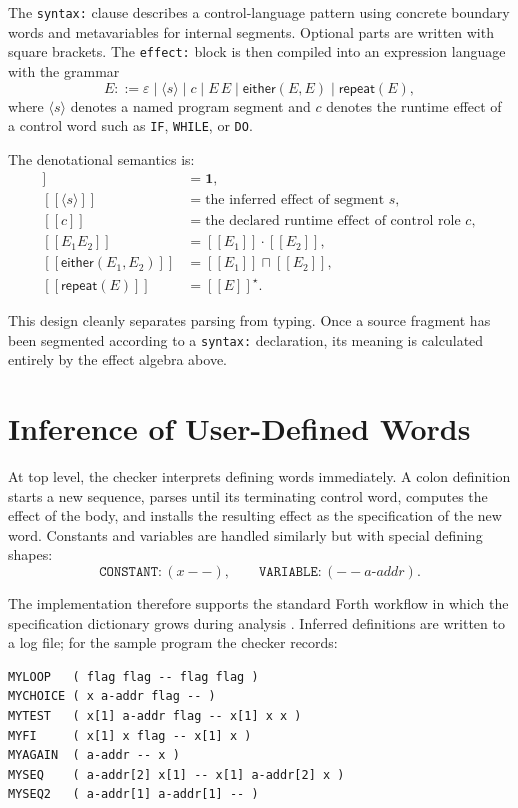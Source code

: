 \documentclass[11pt]{article}
\newcommand{\glb}{\mathbin{\sqcap}}
\newcommand{\compose}{\mathbin{\cdot}}
\newcommand{\eps}{\varepsilon}
\newcommand{\id}{\mathbf{1}}
\newcommand{\sem}[1]{[\![#1]\!]}
\begin{document}
The \texttt{syntax:} clause describes a control-language pattern using concrete boundary words and metavariables for internal segments. Optional parts are written with square brackets. The \texttt{effect:} block is then compiled into an expression language with the grammar
\[
E ::= \eps \mid \langle s \rangle \mid c \mid E\,E \mid \textsf{either}(E,E) \mid \textsf{repeat}(E),
\]
where $\langle s \rangle$ denotes a named program segment and $c$ denotes the runtime effect of a control word such as \texttt{IF}, \texttt{WHILE}, or \texttt{DO}.

The denotational semantics is:
\begin{align*}
\sem{\eps} &= \id,\\
\sem{\langle s \rangle} &= \text{the inferred effect of segment } s,\\
\sem{c} &= \text{the declared runtime effect of control role } c,\\
\sem{E_1 E_2} &= \sem{E_1} \compose \sem{E_2},\\
\sem{\textsf{either}(E_1,E_2)} &= \sem{E_1} \glb \sem{E_2},\\
\sem{\textsf{repeat}(E)} &= \sem{E}^\star.
\end{align*}

This design cleanly separates parsing from typing. Once a source fragment has been segmented according to a \texttt{syntax:} declaration, its meaning is calculated entirely by the effect algebra above.

\section{Inference of User-Defined Words}
At top level, the checker interprets defining words immediately. A colon definition starts a new sequence, parses until its terminating control word, computes the effect of the body, and installs the resulting effect as the specification of the new word. Constants and variables are handled similarly but with special defining shapes:
\[
\texttt{CONSTANT} : (x --), \qquad \texttt{VARIABLE} : (-- a\text{-}addr).
\]

The implementation therefore supports the standard Forth workflow in which the specification dictionary grows during analysis \cite{forth2012standard}. Inferred definitions are written to a log file; for the sample program the checker records:
\begin{lstlisting}
MYLOOP   ( flag flag -- flag flag )
MYCHOICE ( x a-addr flag -- )
MYTEST   ( x[1] a-addr flag -- x[1] x x )
MYFI     ( x[1] x flag -- x[1] x )
MYAGAIN  ( a-addr -- x )
MYSEQ    ( a-addr[2] x[1] -- x[1] a-addr[2] x )
MYSEQ2   ( a-addr[1] a-addr[1] -- )
\end{lstlisting}
\end{document}
